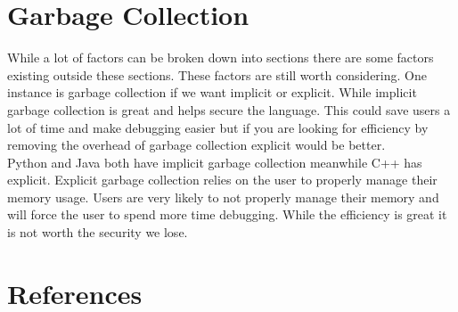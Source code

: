 \documentclass[sigconf, nonacm, authorversion, language=english, 12pt]{acmart}
\begin{document}
\section{Garbage Collection}

While a lot of factors can be broken down into sections there are some factors existing outside these sections. These 
factors are still worth considering. One instance is garbage collection if we want implicit or explicit. While implicit
garbage collection is great and helps secure the language. This could save users a lot of time and make debugging easier 
but if you are looking for efficiency by removing the overhead of garbage collection explicit would be better.\\

Python and Java both have implicit garbage collection meanwhile C++ has explicit. Explicit garbage collection relies on 
the user to properly manage their memory usage. Users are very likely to not properly manage their memory and will 
force the user to spend more time debugging. While the efficiency is great it is not worth the security we lose.\\

\section*{References}
\end{document}
